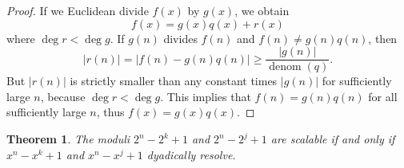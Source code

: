 \documentclass[]{article}
\newtheorem{theorem}{Theorem}[section]
\theoremstyle{definition}
\newcommand{\tri}[3]{\ensuremath{#1^{#2} - #1^{#3} + 1}}
\begin{document}
\begin{proof}
    If we Euclidean divide $f(x)$ by $g(x)$, we obtain
    \begin{equation*}
        f(x) = g(x) q(x) + r(x)
    \end{equation*}
    where $\deg r < \deg g$. If $g(n)$ divides $f(n)$ and $f(n) \neq g(n) q(n)$,
    then
    \begin{equation*}
        |r(n)| = |f(n) - g(n) q(n)| \geq \frac{|g(n)|}{\operatorname{denom}(q)}.
    \end{equation*}
    But $|r(n)|$ is strictly smaller than any constant times $|g(n)|$ for
    sufficiently large $n$, because $\deg r < \deg g$. This implies that $f(n) =
    g(n) q(n)$ for all sufficiently large $n$, thus $f(x) = g(x) q(x)$.
\end{proof}

\begin{theorem}
    The moduli $2^n - 2^k + 1$ and $2^n - 2^j + 1$ are scalable if and only if $\tri{x}{n}{k}$ and $\tri{x}{n}{j}$ dyadically resolve.
\end{theorem}
\end{document}
